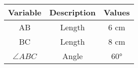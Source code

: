 
\begin{tabular}[12pt]{ |c| c| c|}
    \hline
    \textbf{Variable} & \textbf{Description} & \textbf{Values} \\ 
    \hline
    AB & Length & 6 cm \\
    \hline
    BC & Length & 8 cm \\
    \hline
    $\angle ABC$ & Angle & \ang{60}\\
    \hline 
    \end{tabular}

